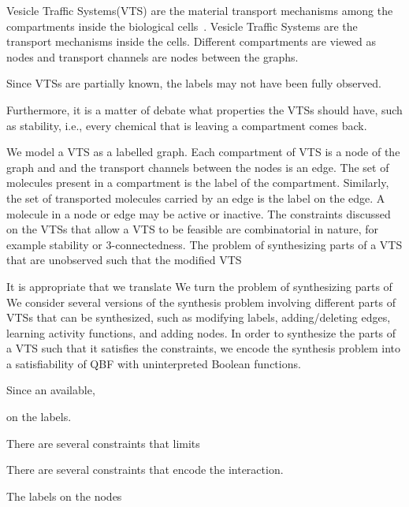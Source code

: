 Vesicle Traffic Systems(VTS) are the material transport mechanisms
among the compartments inside the biological cells~\cite{vtsIntro}.
%
%
Vesicle Traffic Systems are the transport mechanisms inside the cells.
%
Different compartments are viewed as nodes and transport channels are
nodes between the graphs.

Since VTSs are partially known, 
%
the labels may not have been fully observed.


Furthermore, it is a matter of debate what properties the VTSs should
have, such as stability, i.e., every chemical that is leaving a
compartment comes back.



We model a VTS as a labelled graph.
%
Each compartment of VTS is a node of the graph and and the
transport channels between the nodes is an edge.
%
The set of molecules present in a compartment is the label of
the compartment.
% 
Similarly, the set of transported molecules carried by an edge is the label
on the edge.
%
A molecule in a node or edge may be active or inactive. 
%
The constraints discussed on the VTSs that allow a VTS to be feasible
are combinatorial in nature, for example stability or 3-connectedness.
%
The problem of synthesizing parts of a VTS that are unobserved such that 
the modified VTS 

It is appropriate that we translate 
We turn the problem of synthesizing parts of 
%
We consider several versions of the synthesis problem involving different
parts of VTSs that can be synthesized, such as modifying labels,
adding/deleting edges, learning activity functions, and adding nodes.
%
In order to synthesize the parts of a VTS such that it satisfies the constraints, 
we encode the synthesis problem into a satisfiability of QBF with uninterpreted
Boolean functions. 


Since an available, 

on the labels.


There are several constraints that limits 

There are several constraints that encode the interaction.


The labels on the nodes 



